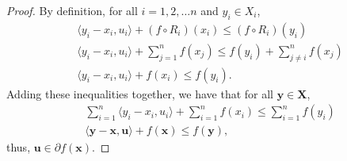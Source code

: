 \documentclass[11pt]{article}
\newcommand\inner[2]{\langle #1, #2 \rangle}
\begin{document}
		 \begin{proof}
			By definition, for all $i=1,2,\ldots n$ and $y_i\in X_i$,
			\begin{align*}
				& \inner{y_i - x_i}{u_i} + (f\circ R_i)(x_i)\leq (f\circ R_i)(y_i)\\
				& \inner{y_i - x_i}{u_i} + \sum_{j=1}^{n}f(x_j) \leq f(y_i) + \sum_{j\neq i}^{n}f(x_j) \\
				& \inner{y_i - x_i}{u_i} + f(x_i) \leq f(y_i).
			\end{align*}
			Adding these inequalities together, we have that for all $\bm{y}\in\bm{X}$, 
			\begin{align*}
				& \sum_{i=1}^{n}\inner{y_i - x_i}{u_i} + \sum_{i=1}^{n}f(x_i) \leq \sum_{i=1}^{n}f(y_i) \\
				& \inner{\bm{y} - \bm{x}}{\bm{u}} + f(\bm{x}) \leq f(\bm{y}),
			\end{align*}
			thus, $\bm{u}\in \partial f(\bm{x})$.
		\end{proof}
	\printbibliography
\end{document}
